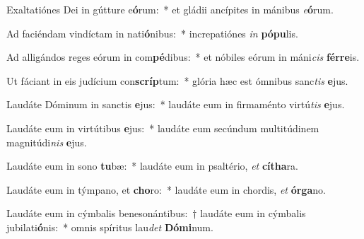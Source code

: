 \item Exaltatiónes Dei in gútture e\textbf{ó}rum:~* et gládii ancípites in mánibus \textit{e}\textbf{ó}rum.
\item Ad faciéndam vindíctam in nati\textbf{ó}nibus:~* increpatiónes \textit{in} \textbf{pó}\textbf{pu}lis.
\item Ad alligándos reges eórum in com\textbf{pé}dibus:~* et nóbiles eórum in máni\textit{cis} \textbf{fér}\textbf{re}is.
\item Ut fáciant in eis judícium con\textbf{scríp}tum:~* glória hæc est ómnibus sanc\textit{tis} \textbf{e}jus.
\item Laudáte Dóminum in sanctis \textbf{e}jus:~* laudáte eum in firmaménto virtú\textit{tis} \textbf{e}jus.
\item Laudáte eum in virtútibus \textbf{e}jus:~* laudáte eum secúndum multitúdinem magnitúdi\textit{nis} \textbf{e}jus.
\item Laudáte eum in sono \textbf{tu}bæ:~* laudáte eum in psaltério, \textit{et} \textbf{cí}\textbf{tha}ra.
\item Laudáte eum in týmpano, et \textbf{cho}ro:~* laudáte eum in chordis, \textit{et} \textbf{ór}\textbf{ga}no.
\item Laudáte eum in cýmbalis benesonántibus:~† laudáte eum in cýmbalis jubilati\textbf{ó}nis:~* omnis spíritus lau\textit{det} \textbf{Dó}\textbf{mi}num.
